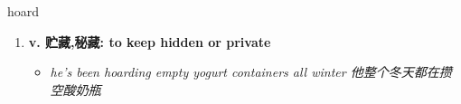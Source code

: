 
\begin{frame}
{\huge hoard}
\begin{center}
\begin{enumerate}\Large
  \item \textbf{v. 贮藏,秘藏: to keep hidden or private}
  \begin{itemize}
    \item \em{\Large{he's been hoarding empty yogurt containers all winter 他整个冬天都在攒空酸奶瓶}}
  \end{itemize}
\end{enumerate}
\end{center}
\end{frame}
